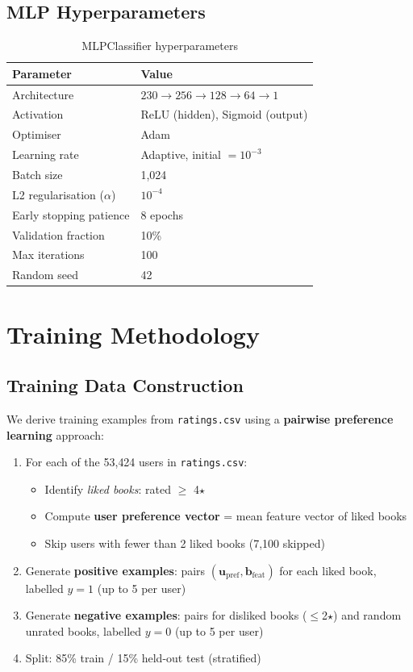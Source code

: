 \documentclass[12pt, a4paper]{article}
\newcommand{\code}[1]{\texttt{\small\color{shelfPurple}#1}}
\begin{document}
\subsection{MLP Hyperparameters}

\begin{table}[H]
\centering
\caption{MLPClassifier hyperparameters}
\begin{tabular}{@{}ll@{}}
\toprule
\textbf{Parameter} & \textbf{Value} \\
\midrule
Architecture & $230 \to 256 \to 128 \to 64 \to 1$ \\
Activation & ReLU (hidden), Sigmoid (output) \\
Optimiser & Adam \\
Learning rate & Adaptive, initial $= 10^{-3}$ \\
Batch size & 1{,}024 \\
L2 regularisation ($\alpha$) & $10^{-4}$ \\
Early stopping patience & 8 epochs \\
Validation fraction & 10\% \\
Max iterations & 100 \\
Random seed & 42 \\
\bottomrule
\end{tabular}
\end{table}

\section{Training Methodology}

\subsection{Training Data Construction}

We derive training examples from \code{ratings.csv} using a \textbf{pairwise
preference learning} approach:

\begin{enumerate}[leftmargin=*, itemsep=4pt]
  \item For each of the 53{,}424 users in \code{ratings.csv}:
  \begin{itemize}
    \item Identify \emph{liked books}: rated $\geq$ 4$\star$
    \item Compute \textbf{user preference vector} = mean feature vector of liked books
    \item Skip users with fewer than 2 liked books (7{,}100 skipped)
  \end{itemize}
  \item Generate \textbf{positive examples}: pairs $(\mathbf{u}_{\text{pref}}, \mathbf{b}_{\text{feat}})$
        for each liked book, labelled $y = 1$ (up to 5 per user)
  \item Generate \textbf{negative examples}: pairs for disliked books ($\leq$2$\star$)
        and random unrated books, labelled $y = 0$ (up to 5 per user)
  \item Split: 85\% train / 15\% held-out test (stratified)
\end{enumerate}
\end{document}
